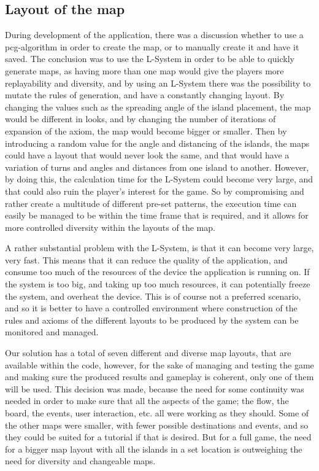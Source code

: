 \subsection{Layout of the map}
During development of the application, there was a discussion whether to use a pcg-algorithm in order to create the map, or to manually create it and have it saved. The conclusion was to use the L-System in order to be able to quickly generate maps, as having more than one map would give the players more replayability and diversity, and by using an L-System there was the possibility to mutate the rules of generation, and have a constantly changing layout. By changing the values such as the spreading angle of the island placement, the map would be different in looks, and by changing the number of iterations of expansion of the axiom, the map would become bigger or smaller. Then by introducing a random value for the angle and distancing of the islands, the maps could have a layout that would never look the same, and that would have a variation of turns and angles and distances from one island to another. However, by doing this, the calculation time for the L-System could become very large, and that could also ruin the player's interest for the game. So by compromising and rather create a multitude of different pre-set patterns, the execution time can easily be managed to be within the time frame that is required, and it allows for more controlled diversity within the layouts of the map.

A rather substantial problem with the L-System, is that it can become very large, very fast. This means that it can reduce the quality of the application, and consume too much of the resources of the device the application is running on. If the system is too big, and taking up too much resources, it can potentially freeze the system, and overheat the device. This is of course not a preferred scenario, and so it is better to have a controlled environment where construction of the rules and axioms of the different layouts to be produced by the system can be monitored and managed.

Our solution has a total of seven different and diverse map layouts, that are available within the code, however, for the sake of managing and testing the game and making sure the produced results and gameplay is coherent, only one of them will be used. This decision was made, because the need for some continuity was needed in order to make sure that all the aspects of the game; the flow, the board, the events, user interaction, etc. all were working as they should. 
Some of the other maps were smaller, with fewer possible destinations and events, and so they could be suited for a tutorial if that is desired. But for a full game, the need for a bigger map layout with all the islands in a set location is outweighing the need for diversity and changeable maps.


